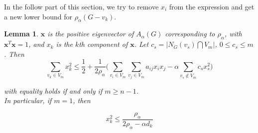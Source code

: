 \documentclass[amsthm]{elsart}
\newtheorem{lemma}{Lemma}[section]
\begin{document}
In the follow part of this section, we try to remove $x_i$ from the expression and get a new lower bound for $\rho _\alpha(G-v_k)$.

\begin{lemma}
$\textbf{x}$ is the positive eigenvector of $A_\alpha (G)$ corresponding to $\rho _\alpha$, with $\textbf{x}^T \textbf{x} = 1$, and $x_k$ is the $k$th component of $\textbf{x}$. Let $ c_s = |N_G(v_s) \bigcap V_m|$,  $0 \leqslant c_s \leqslant m$. Then
\begin{equation} \label{equ:11}
\sum \limits_{v_k \in V_m}^{} x_k^2
\leqslant \frac{1}{2} + \frac{1}{2 \rho_\alpha} \Big( \sum \limits_{v_i \in V_m}^{} \sum \limits_{v_j \in V_m}^{} a_{ij} x_i x_j - \alpha \sum \limits_{v_s \notin V_m}^{} c_s x_s^2 \Big)
\end{equation}

with equality holds if and only if $m \geqslant n - 1$.
\\ In particular, if $m = 1$, then

\begin{equation} \label{equ:12}
 x_k^2 \leqslant \frac{\rho_\alpha}{2 \rho_\alpha - \alpha d_k}
\end{equation}
\end{lemma}
\end{document}
